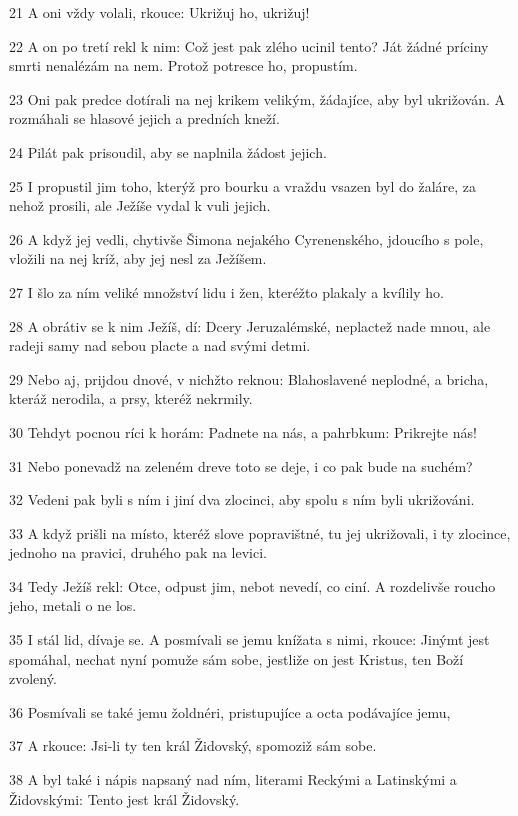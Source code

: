 \par 21 A oni vždy volali, rkouce: Ukrižuj ho, ukrižuj!
\par 22 A on po tretí rekl k nim: Což jest pak zlého ucinil tento? Ját žádné príciny smrti nenalézám na nem. Protož potresce ho, propustím.
\par 23 Oni pak predce dotírali na nej krikem velikým, žádajíce, aby byl ukrižován. A rozmáhali se hlasové jejich a predních kneží.
\par 24 Pilát pak prisoudil, aby se naplnila žádost jejich.
\par 25 I propustil jim toho, kterýž pro bourku a vraždu vsazen byl do žaláre, za nehož prosili, ale Ježíše vydal k vuli jejich.
\par 26 A když jej vedli, chytivše Šimona nejakého Cyrenenského, jdoucího s pole, vložili na nej kríž, aby jej nesl za Ježíšem.
\par 27 I šlo za ním veliké množství lidu i žen, kteréžto plakaly a kvílily ho.
\par 28 A obrátiv se k nim Ježíš, dí: Dcery Jeruzalémské, neplactež nade mnou, ale radeji samy nad sebou placte a nad svými detmi.
\par 29 Nebo aj, prijdou dnové, v nichžto reknou: Blahoslavené neplodné, a bricha, kteráž nerodila, a prsy, kteréž nekrmily.
\par 30 Tehdyt pocnou ríci k horám: Padnete na nás, a pahrbkum: Prikrejte nás!
\par 31 Nebo ponevadž na zeleném dreve toto se deje, i co pak bude na suchém?
\par 32 Vedeni pak byli s ním i jiní dva zlocinci, aby spolu s ním byli ukrižováni.
\par 33 A když prišli na místo, kteréž slove popravištné, tu jej ukrižovali, i ty zlocince, jednoho na pravici, druhého pak na levici.
\par 34 Tedy Ježíš rekl: Otce, odpust jim, nebot nevedí, co ciní. A rozdelivše roucho jeho, metali o ne los.
\par 35 I stál lid, dívaje se. A posmívali se jemu knížata s nimi, rkouce: Jinýmt jest spomáhal, nechat nyní pomuže sám sobe, jestliže on jest Kristus, ten Boží zvolený.
\par 36 Posmívali se také jemu žoldnéri, pristupujíce a octa podávajíce jemu,
\par 37 A rkouce: Jsi-li ty ten král Židovský, spomoziž sám sobe.
\par 38 A byl také i nápis napsaný nad ním, literami Reckými a Latinskými a Židovskými: Tento jest král Židovský.
